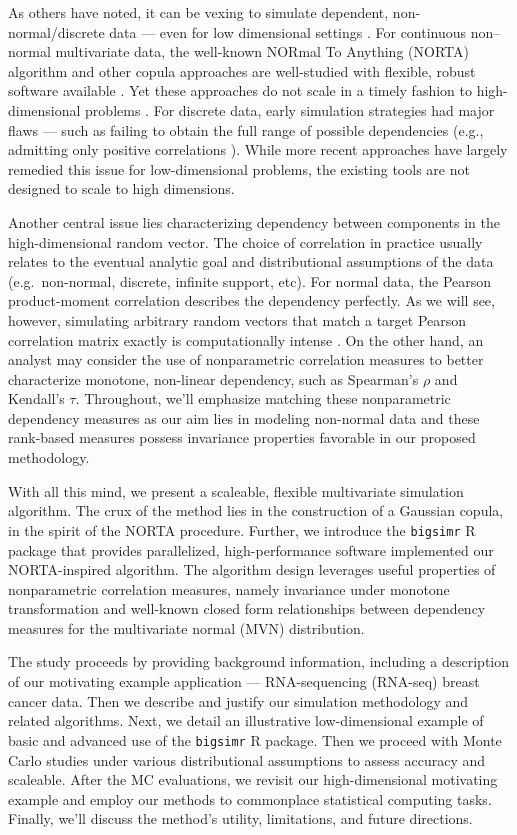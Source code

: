 \documentclass[]{article}
\begin{document}
As others have noted, it can be vexing to simulate dependent, non-normal/discrete data --- even for low dimensional settings \citep{MB13, XZ19}.
For continuous non--normal multivariate data, the well-known NORmal To Anything (NORTA) algorithm \citep{Cario1997} and other copula \citep{Nelsen2007} approaches are well-studied with flexible, robust software available \citep{Yan2007, Chen2001}.
Yet these approaches do not scale in a timely fashion to high-dimensional problems \citep{Li2019gpu}.
For discrete data, early simulation strategies had major flaws --- such as failing to obtain the full range of possible dependencies (e.g., admitting only positive correlations \citet{Park1996}).
While more recent approaches \citep{MB13, Xia17, BF17} have largely remedied this issue for low-dimensional problems, the existing tools are not designed to scale to high dimensions.

Another central issue lies characterizing dependency between components in the high-dimensional random vector.
The choice of correlation in practice usually relates to the eventual analytic goal and distributional assumptions of the data (e.g.~non-normal, discrete, infinite support, etc).
For normal data, the Pearson product-moment correlation describes the dependency perfectly.
As we will see, however, simulating arbitrary random vectors that match a target Pearson correlation matrix exactly is computationally intense \citep{Chen2001, Xia17}.
On the other hand, an analyst may consider the use of nonparametric correlation measures to better characterize monotone, non-linear dependency, such as Spearman's \(\rho\) and Kendall's \(\tau\).
Throughout, we'll emphasize matching these nonparametric dependency measures as our aim lies in modeling non-normal data and these rank-based measures possess invariance properties favorable in our proposed methodology.

With all this mind, we present a scaleable, flexible multivariate simulation algorithm.
The crux of the method lies in the construction of a Gaussian copula, in the spirit of the NORTA procedure.
Further, we introduce the \texttt{bigsimr} R package that provides parallelized, high-performance software implemented our NORTA-inspired algorithm.
The algorithm design leverages useful properties of nonparametric correlation measures, namely invariance under monotone transformation and well-known closed form relationships between dependency measures for the multivariate normal (MVN) distribution.

The study proceeds by providing background information, including a description of our motivating example application --- RNA-sequencing (RNA-seq) breast cancer data.
Then we describe and justify our simulation methodology and related algorithms.
Next, we detail an illustrative low-dimensional example of basic and advanced use of the \texttt{bigsimr} R package.
Then we proceed with Monte Carlo studies under various distributional assumptions to assess accuracy and scaleable.
After the MC evaluations, we revisit our high-dimensional motivating example and employ our methods to commonplace statistical computing tasks.
Finally, we'll discuss the method's utility, limitations, and future directions.
\end{document}
